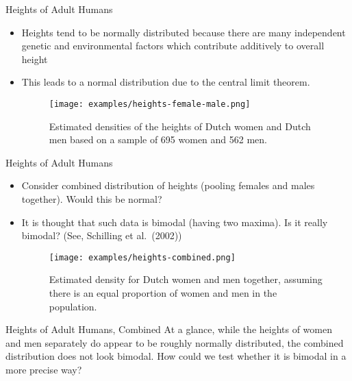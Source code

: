 \documentclass[
  ignorenonframetext,
]{beamer}
\providecommand{\tightlist}{%
  \setlength{\itemsep}{0pt}\setlength{\parskip}{0pt}}
\begin{document}
\begin{frame}{Heights of Adult Humans}
\protect\hypertarget{heights-of-adult-humans}{}
\begin{itemize}
\tightlist
\item
  Heights tend to be normally distributed because there are many
  independent genetic and environmental factors which contribute
  additively to overall height
\item
  This leads to a normal distribution due to the central limit theorem.

  \begin{figure}
  \begin{center}
    \texttt{[image: examples/heights-female-male.png]}
  \end{center}
  \caption{Estimated densities of the heights of Dutch women and Dutch men based on a sample of 695 women and 562 men.}
  \label{figure:heights}
  \end{figure}
\end{itemize}
\end{frame}

\begin{frame}{Heights of Adult Humans}
\protect\hypertarget{heights-of-adult-humans-1}{}
\begin{itemize}
\tightlist
\item
  Consider combined distribution of heights (pooling females and males
  together). Would this be normal?
\item
  It is thought that such data is bimodal (having two maxima). Is it
  really bimodal? (See, Schilling et al.~(2002))

  \begin{figure}
  \begin{center}
    \texttt{[image: examples/heights-combined.png]}
  \end{center}
  \caption{Estimated density for Dutch women and men together, assuming there is an equal proportion of women and men in the population.}
  \label{figure:heights-combined}
  \end{figure}
\end{itemize}
\end{frame}

\begin{frame}{Heights of Adult Humans, Combined}
\protect\hypertarget{heights-of-adult-humans-combined}{}
At a glance, while the heights of women and men separately do appear to
be roughly normally distributed, the combined distribution does not look
bimodal. How could we test whether it is bimodal in a more precise way?
\end{frame}
\end{document}
